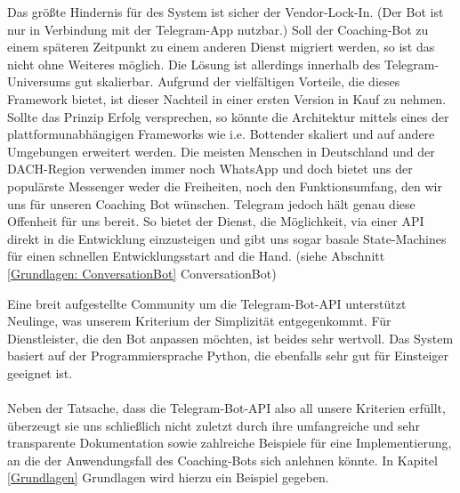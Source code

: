         Das größte Hindernis für des System ist sicher der Vendor-Lock-In. (Der Bot ist nur in Verbindung mit der Telegram-App nutzbar.) Soll der Coaching-Bot zu einem späteren Zeitpunkt zu einem anderen Dienst migriert werden, so ist das nicht ohne Weiteres möglich. Die Lösung ist allerdings innerhalb des Telegram-Universums gut skalierbar. Aufgrund der vielfältigen Vorteile, die dieses Framework bietet, ist dieser Nachteil in einer ersten Version in Kauf zu nehmen. Sollte das Prinzip Erfolg versprechen, so könnte die Architektur mittels eines der plattformunabhängigen Frameworks wie i.e. Bottender skaliert und auf andere Umgebungen erweitert werden.
        Die meisten Menschen in Deutschland und der DACH-Region verwenden immer noch WhatsApp \cite{Nutzerzahlen} und doch bietet uns der populärste Messenger weder die Freiheiten, noch den Funktionsumfang, den wir uns für unseren Coaching Bot wünschen. Telegram jedoch hält genau diese Offenheit für uns bereit. \cite{telegramVergleich} So bietet der Dienst, die Möglichkeit, via einer API direkt in die Entwicklung einzusteigen und gibt uns sogar basale State-Machines für einen schnellen Entwicklungsstart and die Hand. (siehe Abschnitt \ref*{Grundlagen: ConversationBot} ConversationBot)
        
        Eine breit aufgestellte Community um die Telegram-Bot-API unterstützt Neulinge, was unserem Kriterium der Simplizität entgegenkommt. Für Dienstleister, die den Bot anpassen möchten, ist beides sehr wertvoll. Das System basiert auf der Programmiersprache Python, die ebenfalls sehr gut für Einsteiger geeignet ist. \\ \\
        
        Neben der Tatsache, dass die Telegram-Bot-API also all unsere Kriterien erfüllt, überzeugt sie uns schließlich nicht zuletzt durch ihre umfangreiche und sehr transparente Dokumentation sowie zahlreiche Beispiele für eine Implementierung, an die der Anwendungsfall des Coaching-Bots sich anlehnen könnte. In Kapitel \ref*{Grundlagen} Grundlagen wird hierzu ein Beispiel gegeben.

        
         
    